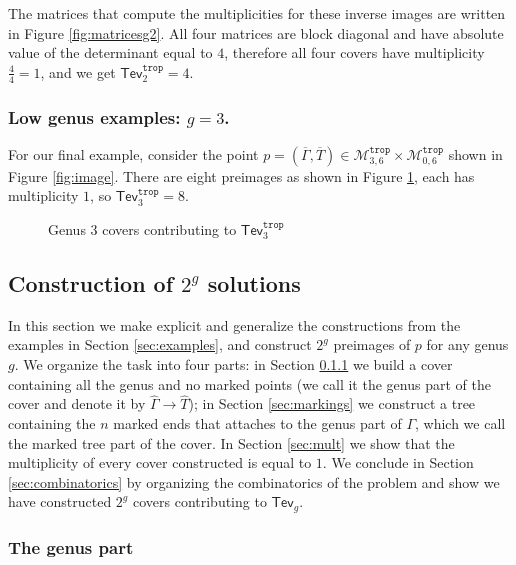 \documentclass[11pt,reqno]{amsart}
\newcommand{\inputTikZ}[2]{%
     \resizebox{#1}{!}{}}
\theoremstyle{definition}
\newcommand\trop{{\mathtt{trop}}}
\newcommand\Mgn[1]{\mathcal M_{#1}}
\newcommand{\gGamma}{\widehat{\Gamma}}
\newcommand{\gT}{\widehat{T}}
\newcommand{\Tev}{{\mathsf{Tev}}}
\begin{document}
The matrices that compute the multiplicities for these inverse images are written in Figure \ref{fig:matricesg2}.
All four matrices are block diagonal and have absolute value of the determinant equal to $4$, therefore all four covers have multiplicity $\frac{4}{4} =  1$, and we get $\Tev_2^\trop=4$. 

\subsubsection{Low genus examples: $g=3$.}
For our final example, consider the point $p=(\overline{\Gamma},\overline{T})\in \Mgn{3,6}^\trop\times\Mgn{0,6}^\trop$ shown in Figure \ref{fig:image}. There are eight preimages as shown in Figure \ref{fig:genus3}, each has multiplicity $1$, so $\Tev_3^\trop=8.$
\begin{figure}
    \centering
    \inputTikZ{.8 \textwidth}{Figures/genus3}
    \caption{Genus 3 covers contributing to $\Tev_3^\trop$}
    \label{fig:genus3}
\end{figure}
\subsection{Construction of $2^g$ solutions}

\label{sec:solutions} 
In this section we make explicit and generalize the constructions from the examples in Section \ref{sec:examples}, and construct $2^g$ preimages of $p$ for any genus $g$. We organize the task into four parts: in Section \ref{sec:genuspart} we build a cover containing all the genus and no marked points (we call it the genus part of  the cover and denote it by $\gGamma\to \gT$); in Section \ref{sec:markings}  we construct a tree containing the $n$ marked  ends that attaches to the genus part of $\Gamma$, which we call the marked tree part of the cover. In Section \ref{sec:mult} we show that the multiplicity of every cover constructed is equal to $1$. We conclude in Section \ref{sec:combinatorics} by organizing the combinatorics of the problem and show we have constructed $2^g$ covers contributing to $\Tev_g$.

\subsubsection{The genus part}
\label{sec:genuspart}
\end{document}
